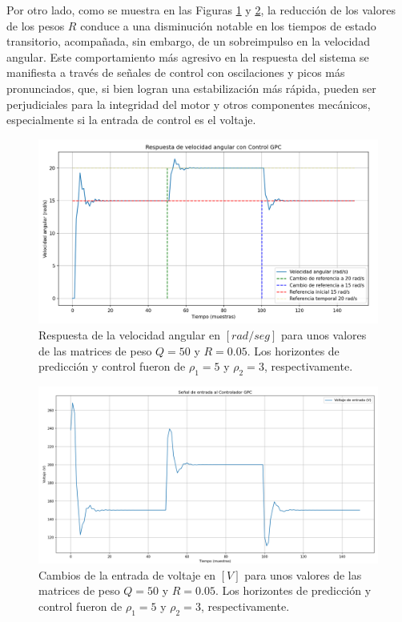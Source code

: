\documentclass[journal]{IEEEtran}
\begin{document}
Por otro lado, como se muestra en las Figuras \ref{fig:practico-7} y \ref{fig:practico-8}, la reducción de los valores de los pesos \( R \) conduce a una disminución notable en los tiempos de estado transitorio, acompañada, sin embargo, de un sobreimpulso en la velocidad angular. Este comportamiento más agresivo en la respuesta del sistema se manifiesta a través de señales de control con oscilaciones y picos más pronunciados, que, si bien logran una estabilización más rápida, pueden ser perjudiciales para la integridad del motor y otros componentes mecánicos, especialmente si la entrada de control es el voltaje.

\begin{figure}[H]
    \centering
    \includegraphics[width=1\linewidth]{imagen5.png}
    \caption{Respuesta de la velocidad angular en $[rad/seg]$ para unos valores de las matrices de peso $Q = 50$ y $R= 0.05$. Los horizontes de predicción y control fueron de $\rho_1 = 5$  y $\rho_2 = 3$, respectivamente. }
    \label{fig:practico-7}
\end{figure}


\begin{figure}[H]
    \centering
    \includegraphics[width=1\linewidth]{imagen 6.png}
    \caption{Cambios de la entrada de voltaje en $[V]$ para unos valores de las matrices de peso $Q = 50$ y $R= 0.05$. Los horizontes de predicción y control fueron de $\rho_1 = 5$  y $\rho_2 = 3$, respectivamente. }
    \label{fig:practico-8}
\end{figure}
\end{document}
